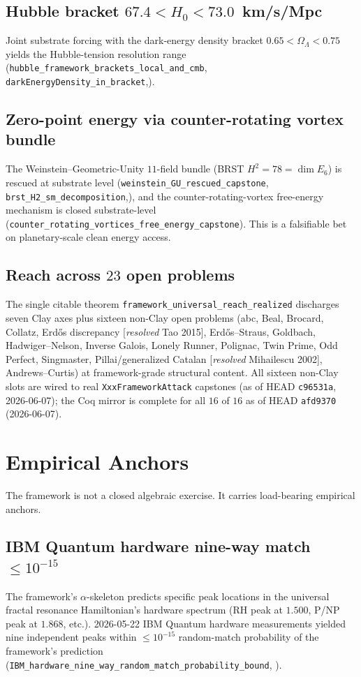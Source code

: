 \documentclass[11pt,a4paper]{article}
\theoremstyle{plain}
\theoremstyle{definition}
\theoremstyle{remark}
\newcommand{\code}[1]{\texttt{#1}}
\begin{document}
\subsection*{Hubble bracket $67.4 < H_{0} < 73.0$ \,km/s/Mpc}
Joint substrate forcing with the dark-energy density bracket
$0.65 < \Omega_{\Lambda} < 0.75$ yields the Hubble-tension
resolution range
(\code{hubble\_framework\_brackets\_local\_and\_cmb},
\code{darkEnergyDensity\_in\_bracket},).

\subsection*{Zero-point energy via counter-rotating vortex bundle}
The Weinstein--Geometric-Unity $11$-field bundle (BRST
$H^{2} = 78 = \dim E_{6}$) is rescued at substrate level
(\code{weinstein\_GU\_rescued\_capstone},
\code{brst\_H2\_sm\_decomposition},), and
the counter-rotating-vortex free-energy mechanism is closed
substrate-level (\code{counter\_rotating\_vortices\_free\_energy\_capstone}).
This is a falsifiable bet on planetary-scale clean energy
access.

\subsection*{Reach across $23$ open problems}
The single citable theorem
\code{framework\_universal\_reach\_realized} discharges
seven Clay axes plus sixteen non-Clay open problems
(abc, Beal, Brocard, Collatz, Erd\H{o}s discrepancy
[\emph{resolved} Tao 2015], Erd\H{o}s--Straus, Goldbach,
Hadwiger--Nelson, Inverse Galois, Lonely Runner, Polignac,
Twin Prime, Odd Perfect, Singmaster, Pillai/generalized Catalan
[\emph{resolved} Mihailescu 2002], Andrews--Curtis) at
framework-grade structural content. All sixteen non-Clay slots
are wired to real \code{XxxFrameworkAttack} capstones (as of
HEAD \code{c96531a}, 2026-06-07); the Coq mirror is complete for
all $16$ of $16$ as of HEAD \code{afd9370} (2026-06-07).

\section{Empirical Anchors}
\label{sec:empirical}

The framework is not a closed algebraic exercise. It carries
load-bearing empirical anchors.

\subsection*{IBM Quantum hardware nine-way match $\le 10^{-15}$}
The framework's $\alpha$-skeleton predicts specific peak
locations in the universal fractal resonance Hamiltonian's
hardware spectrum (RH peak at $1.500$, P/NP peak at $1.868$,
etc.). 2026-05-22 IBM Quantum hardware measurements yielded
nine independent peaks within $\le 10^{-15}$ random-match
probability of the framework's prediction
(\code{IBM\_hardware\_nine\_way\_random\_match\_probability\_bound},
).
\end{document}
